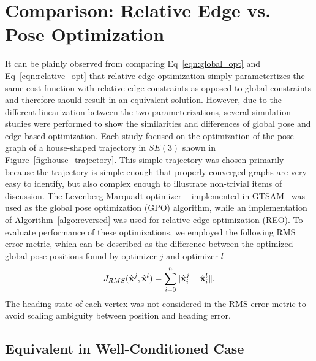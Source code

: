 
\section{Comparison: Relative Edge vs. Pose Optimization}

It can be plainly observed from comparing Eq~\ref{eqn:global_opt} and Eq~\ref{eqn:relative_opt} that relative edge optimization simply parametertizes the same cost function with relative edge constraints as opposed to global constraints and therefore should result in an equivalent solution.  However, due to the different linearization between the two parameterizations, several simulation studies were performed to show the similarities and differences of global pose and edge-based optimization. Each study focused on the optimization of the pose graph of a house-shaped trajectory in $SE(3)$ shown in Figure~\ref{fig:house_trajectory}.  This simple trajectory was chosen primarily because the trajectory is simple enough that properly converged graphs are very easy to identify, but also complex enough to illustrate non-trivial items of discussion.  The Levenberg-Marquadt optimizer ~\cite{LM Optimization} implemented in GTSAM~\cite{Dellaert2012 - GTSAM} was used as the global pose optimization (GPO) algorithm, while an implementation of Algorithm~\ref{algo:reversed} was used for relative edge optimization (REO).  To evaluate performance of these optimizations, we employed the following RMS error metric, which can be described as the difference between the optimized global pose positions found by optimizer $j$ and optimizer $l$
\begin{align}
    J_{RMS}(\hat{\mathbf{x}}^j, \hat{\mathbf{x}}^l) = \sum_{i=0}^n \lVert \hat{\mathbf{x}}^j_i - \hat{\mathbf{x}}^l_i \rVert.
    \label{eq:RMS_error}
\end{align}
The heading state of each vertex was not considered in the RMS error metric to avoid scaling ambiguity between position and heading error.

\subsection{Equivalent in Well-Conditioned Case}

